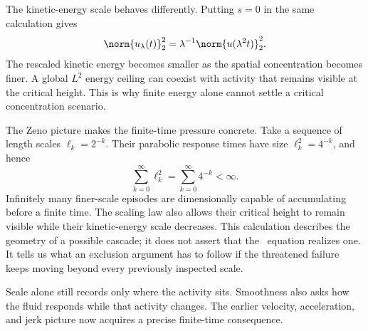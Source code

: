 The kinetic-energy scale behaves differently.
Putting \(s=0\) in the same calculation gives
\[
  \norm{u_\lambda(t)}_2^2
  =
  \lambda^{-1}
  \norm{u(\lambda^2t)}_2^2.
\]
The rescaled kinetic energy becomes smaller as the spatial concentration becomes finer.
A global \(L^2\) energy ceiling can coexist with activity that remains visible at the critical height.
This is why finite energy alone cannot settle a critical concentration scenario.

The Zeno picture makes the finite-time pressure concrete.
Take a sequence of length scales \(\ell_k=2^{-k}\).
Their parabolic response times have size \(\ell_k^2=4^{-k}\), and hence
\[
  \sum_{k=0}^{\infty}\ell_k^2
  =
  \sum_{k=0}^{\infty}4^{-k}
  <\infty.
\]
Infinitely many finer-scale episodes are dimensionally capable of accumulating before a finite time.
The scaling law also allows their critical height to remain visible while their kinetic-energy scale decreases.
This calculation describes the geometry of a possible cascade; it does not assert that the \NavierStokes\ equation realizes one.
It tells us what an exclusion argument has to follow if the threatened failure keeps moving beyond every previously inspected scale.

Scale alone still records only where the activity sits.
Smoothness also asks how the fluid responds while that activity changes.
The earlier velocity, acceleration, and jerk picture now acquires a precise finite-time consequence.

